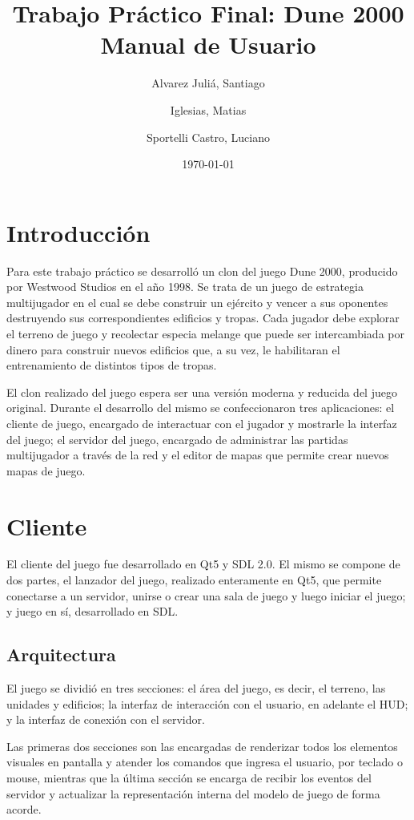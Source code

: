 \documentclass[titlepage,a4paper,12pt]{article}
\title{ Trabajo Práctico Final: Dune 2000 \\ 
 \large{Manual de Usuario}}
\author{Alvarez Juliá, Santiago \and Iglesias, Matias \and Sportelli Castro, Luciano}
\date{ \today }
\begin{document}
\maketitle

\tableofcontents %

\newpage
\section{Introducción}
Para este trabajo práctico se desarrolló un clon del juego Dune 2000, producido por Westwood Studios en el año 1998. Se trata de un juego de estrategia multijugador en el cual se debe construir un ejército y vencer a sus oponentes destruyendo sus correspondientes edificios y tropas.
Cada jugador debe explorar el terreno de juego y recolectar especia melange que puede ser intercambiada por dinero para construir nuevos edificios que, a su vez, le habilitaran el entrenamiento de distintos tipos de tropas.

El clon realizado del juego espera ser una versión moderna y reducida del juego original. Durante el desarrollo del mismo se confeccionaron tres aplicaciones: el cliente de juego, encargado de interactuar con el jugador y mostrarle la interfaz del juego; el servidor del juego, encargado de administrar las partidas multijugador a través de la red y el editor de mapas que permite crear nuevos mapas de juego.

\section{Cliente}
El cliente del juego fue desarrollado en Qt5 y SDL 2.0. El mismo se compone de dos partes, el lanzador del juego, realizado enteramente en Qt5, que permite conectarse a un servidor, unirse o crear una sala de juego y luego iniciar el juego; y juego en sí, desarrollado en SDL.

\subsection{Arquitectura}
El juego se dividió en tres secciones: el área del juego, es decir, el terreno, las unidades y edificios; la interfaz de interacción con el usuario, en adelante el HUD; y la interfaz de conexión con el servidor.

Las primeras dos secciones son las encargadas de renderizar todos los elementos visuales en pantalla y atender los comandos que ingresa el usuario, por teclado o mouse, mientras que la última sección se encarga de recibir los eventos del servidor y actualizar la representación interna del modelo de juego de forma acorde.
\end{document}
